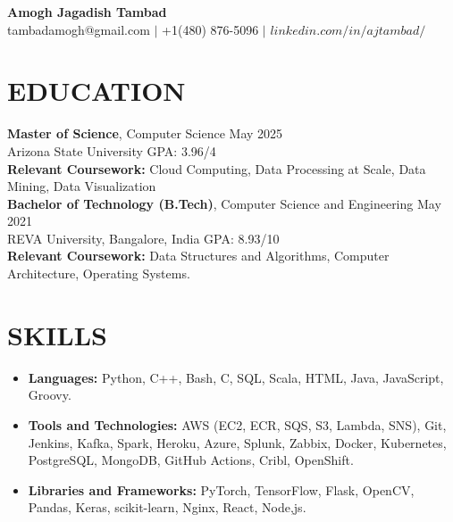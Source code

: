 \documentclass[a4paper,9pt]{extarticle}
\begin{document}
\pagestyle{empty}

\begin{center}
\textbf{\huge Amogh Jagadish Tambad}\\[2pt] %
tambadamogh@gmail.com \hspace{1mm} $|$ \hspace{1mm} +1(480) 876-5096  \hspace{1mm} $|$ \hspace{1mm} $linkedin.com/in/ajtambad/$ \hspace{1mm}
\end{center}

\section*{EDUCATION}
\noindent
\textbf{Master of Science}, Computer Science \hfill May 2025 \\ %
Arizona State University
\hfill GPA: 3.96/4\\ %
\textbf{Relevant Coursework:} Cloud Computing, Data Processing at Scale, Data Mining, Data Visualization\\

\noindent
\textbf{Bachelor of Technology (B.Tech)}, Computer Science and Engineering \hfill May 2021 \\ %
REVA University, Bangalore, India \hfill GPA: 8.93/10\\ %
\textbf{Relevant Coursework:} Data Structures and Algorithms, Computer Architecture, Operating Systems.

\section*{SKILLS}
\begin{itemize}
    \item \textbf{Languages:} Python, C++, Bash, C, SQL, Scala, HTML, Java, JavaScript, Groovy. %
    \item \textbf{Tools and Technologies:} AWS (EC2, ECR, SQS, S3, Lambda, SNS), Git, Jenkins, Kafka, Spark, Heroku, Azure, Splunk, Zabbix, Docker, Kubernetes, PostgreSQL, MongoDB, GitHub Actions, Cribl, OpenShift. %
    \item \textbf{Libraries and Frameworks:} PyTorch, TensorFlow, Flask, OpenCV, Pandas, Keras, scikit-learn, Nginx, React, Node,js.
\end{itemize}
\end{document}
